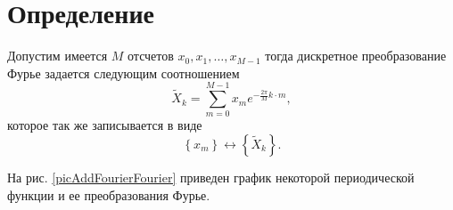 \section{Определение}
\begin{definition}
Допустим имеется $M$ отсчетов $x_0, x_1, \dots, x_{M-1}$ тогда
дискретное преобразование Фурье задается следующим соотношением
\begin{equation}
\tilde{X}_k = \sum^{M - 1}_{m = 0} x_m e^{-\frac{2 \pi}{M} k\cdot m},
\label{eqAddFourierDiscretFourier}
\end{equation}
которое так же записывается в виде
\begin{equation}
\left\{x_m\right\} \longleftrightarrow \left\{\tilde{X}_k\right\}.
\nonumber
\end{equation}
\end{definition}

На рис. \ref{picAddFourierFourier} приведен график некоторой
периодической функции и ее преобразования Фурье. 



